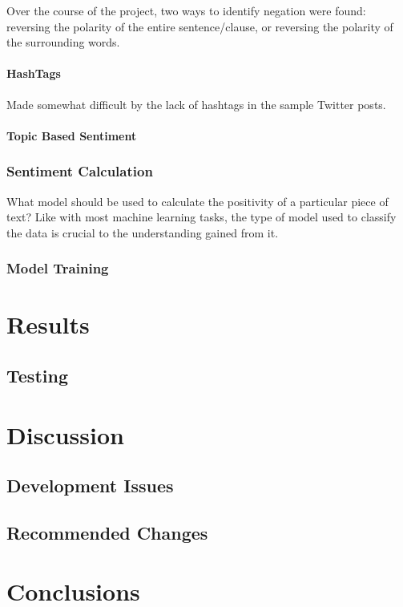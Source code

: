 \documentclass{acm_proc_article-sp}
\begin{document}
			Over the course of the project, two ways to identify negation were found: reversing the polarity of the entire sentence/clause, or reversing the polarity of the surrounding words. 
			\paragraph{HashTags}
			Made somewhat difficult by the lack of hashtags in the sample Twitter posts.
			\paragraph{Topic Based Sentiment}
			
		\subsubsection{Sentiment Calculation}
		What model should be used to calculate the positivity of a particular piece of text? Like with most machine learning tasks, the type of model used to classify the data is crucial to the understanding gained from it. 
		\subsubsection{Model Training}
\section{Results}
	\subsection{Testing}
\section{Discussion}
	\subsection{Development Issues}
	\subsection{Recommended Changes}
\section{Conclusions}
\end{document}
